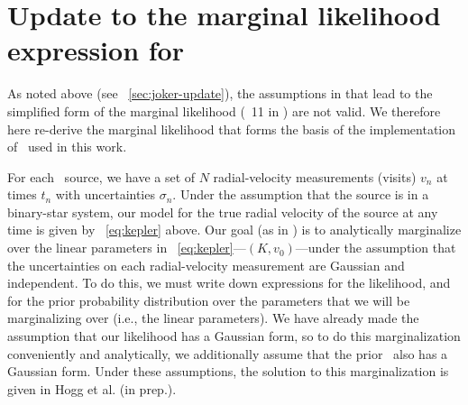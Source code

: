 \documentclass[modern]{aastex63}
\begin{document}
\appendix

\section{Update to the marginal likelihood expression for \thejoker}
\label{app:marginal-likelihood}

As noted above (see \sectionname~\ref{sec:joker-update}), the assumptions in
\cite{thejoker} that lead to the simplified form of the marginal likelihood
(\equationname~11 in \citealt{thejoker}) are not valid.
We therefore here re-derive the marginal likelihood that forms the basis of the
implementation of \thejoker\ used in this work.

For each \apogee\ source, we have a set of $N$ radial-velocity measurements
(visits) $v_n$ at times $t_n$ with uncertainties $\sigma_n$.
Under the assumption that the source is in a binary-star system, our model for
the true radial velocity of the source at any time is given by
\equationname~\ref{eq:kepler} above.
Our goal (as in \citealt{thejoker}) is to analytically marginalize over the
linear parameters in \equationname~\ref{eq:kepler}---$(K, v_0)$---under the
assumption that the uncertainties on each radial-velocity measurement are
Gaussian and independent.
To do this, we must write down expressions for the likelihood, and for the prior
probability distribution over the parameters that we will be marginalizing over
(i.e., the linear parameters).
We have already made the assumption that our likelihood has a Gaussian form, so
to do this marginalization conveniently and analytically, we additionally assume
that the prior \pdf\ also has a Gaussian form.
Under these assumptions, the solution to this marginalization is given in
Hogg et al. (in prep.).
\end{document}
